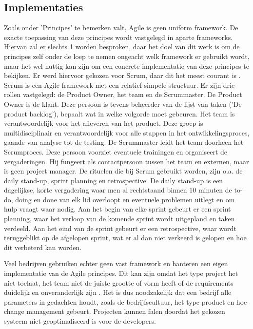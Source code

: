\subsection{Implementaties}
Zoals onder 'Principes' te bemerken valt, Agile is geen uniform framework. De exacte toepassing van deze principes wordt vastgelegd in aparte frameworks. Hiervan zal er slechts 1 worden besproken, daar het doel van dit werk is om de principes zelf onder de loep te nemen ongeacht welk framework er gebruikt wordt, maar het wel nuttig kan zijn om een concrete implementatie van deze principes te bekijken.
Er werd hiervoor gekozen voor Scrum, daar dit het meest courant is \autocite{Sutherland2007}.
Scrum is een Agile framework met een relatief simpele structuur. Er zijn drie rollen vastgelegd: de Product Owner, het team en de Scrummaster. De Product Owner is de klant. Deze persoon is tevens beheerder van de lijst van taken ('De product backlog'), bepaalt wat in welke volgorde moet gebeuren. Het team is verantwoordelijk voor het afleveren van het product. Deze groep is multidisciplinair en verantwoordelijk voor alle stappen in het ontwikkelingsproces, gaande van analyse tot de testing. De Scrummaster leidt het team doorheen het Scrumproces. Deze persoon voorziet eventuele trainingen en organiseert de vergaderingen. Hij fungeert als contactpersoon tussen het team en externen, maar is geen project manager.
De rituelen die bij Scrum gebruikt worden, zijn o.a. de daily stand-up, sprint planning en retrospective. De daily stand-up is een dagelijkse, korte vergadering waar men al rechtstaand binnen 10 minuten de to-do, doing en done van elk lid overloopt en eventuele problemen uitlegt en om hulp vraagt waar nodig. Aan het begin van elke sprint gebeurt er een sprint planning, waar het verloop van de komende sprint wordt uitgepland en taken verdeeld. Aan het eind van de sprint gebeurt er een retrospective, waar wordt teruggeblikt op de afgelopen sprint, wat er al dan niet verkeerd is gelopen en hoe dit verbeterd kan worden.


Veel bedrijven gebruiken echter geen vast framework en hanteren een eigen implementatie van de Agile principes. Dit kan zijn omdat het type project het niet toelaat, het team niet de juiste grootte of vorm heeft of de requirements duidelijk en onveranderlijk zijn \autocite{Naekki2011}. Het is dus noodzakelijk dat een bedrijf alle parameters in gedachten houdt, zoals de bedrijfscultuur, het type product en hoe change management gebeurt. Projecten kunnen falen doordat het gekozen systeem niet geoptimaliseerd is voor de developers.


